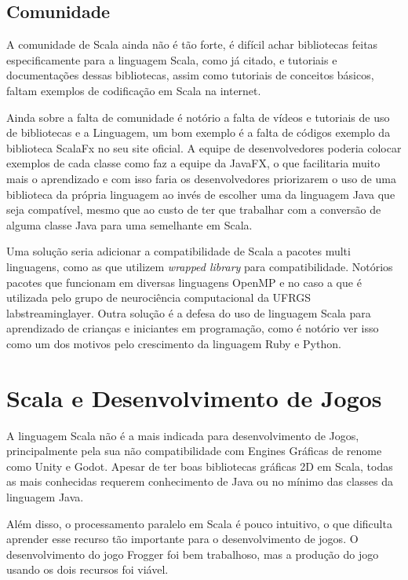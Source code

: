 \documentclass[rel-mlp]{iiufrgs}
\begin{document}
\section{Comunidade}

 A comunidade de Scala ainda não é tão forte, é difícil achar bibliotecas feitas especificamente para a linguagem Scala, como já citado, e tutoriais e documentações dessas bibliotecas, assim como tutoriais de conceitos básicos, faltam exemplos de codificação em Scala na internet.

 Ainda sobre a falta de comunidade é notório a falta de vídeos e tutoriais de uso de bibliotecas e a Linguagem, um bom exemplo é a falta de códigos exemplo da biblioteca ScalaFx no seu site oficial. A equipe de desenvolvedores poderia colocar exemplos de cada classe como faz a equipe da JavaFX, o que facilitaria muito mais o aprendizado e com isso faria os desenvolvedores priorizarem o uso de uma biblioteca da própria linguagem ao invés de escolher uma da linguagem Java que seja compatível, mesmo que ao custo de ter que trabalhar com a conversão de alguma classe Java para uma semelhante em Scala.

 Uma solução seria adicionar a compatibilidade de Scala a pacotes multi linguagens, como as que utilizem \textit{wrapped library} para compatibilidade. Notórios pacotes que funcionam em diversas linguagens OpenMP e no caso a que é utilizada pelo grupo de neurociência computacional da UFRGS labstreaminglayer. Outra solução é a defesa do uso de linguagem Scala para aprendizado de crianças e iniciantes em programação, como é notório ver isso como um dos motivos pelo crescimento da linguagem Ruby e Python.

\chapter{Scala e Desenvolvimento de Jogos}

 A linguagem Scala não é a mais indicada para desenvolvimento de Jogos, principalmente pela sua não compatibilidade com Engines Gráficas de renome como Unity e Godot. Apesar de ter boas bibliotecas gráficas 2D em Scala, todas as mais conhecidas requerem conhecimento de Java ou no mínimo das classes da linguagem Java.
 
  Além disso, o processamento paralelo em Scala é pouco intuitivo, o que dificulta aprender esse recurso tão importante para o desenvolvimento de jogos. O desenvolvimento do jogo Frogger foi bem trabalhoso, mas a produção do jogo usando os dois recursos foi viável.
\end{document}
